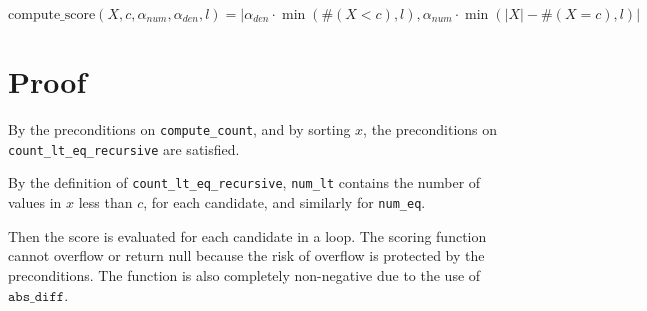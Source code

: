 \documentclass{article}
\begin{document}
\begin{equation}
    \textrm{compute\_score}(X, c, \alpha_{num}, \alpha_{den}, l) = |\alpha_{den} \cdot \min(\#(X < c), l), \alpha_{num} \cdot \min(|X| - \#(X = c), l)|
\end{equation}


\section{Proof}

By the preconditions on \texttt{compute\_count}, 
and by sorting $x$, the preconditions on \texttt{count\_lt\_eq\_recursive} are satisfied.

By the definition of \texttt{count\_lt\_eq\_recursive}, 
\texttt{num\_lt} contains the number of values in $x$ less than $c$, for each candidate, 
and similarly for \texttt{num\_eq}.

Then the score is evaluated for each candidate in a loop.
The scoring function cannot overflow or return null because the risk of overflow is protected 
by the preconditions.
The function is also completely non-negative due to the use of $\texttt{abs\_diff}$.
\end{document}
